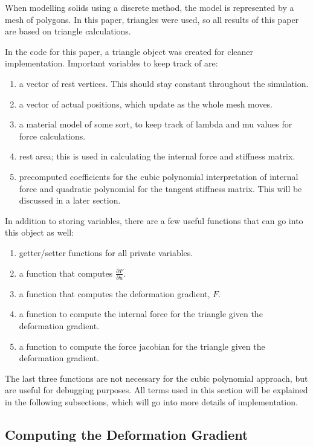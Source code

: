 \documentclass[twocolumn,10pt]{asme2ej}
\begin{document}
When modelling solids using a discrete method, the model is represented by a mesh of polygons. In this paper, triangles were
used, so all results of this paper are based on triangle calculations.

In the code for this paper, a triangle object was created for cleaner implementation. Important variables to keep track of are:
\begin{enumerate}
  \item a vector of rest vertices. This should stay constant throughout the simulation.
  \item a vector of actual positions, which update as the whole mesh moves.
  \item a material model of some sort, to keep track of lambda and mu values for force calculations.
  \item rest area; this is used in calculating the internal force and stiffness matrix.
  \item precomputed coefficients for the cubic polynomial interpretation of internal force and quadratic polynomial
  for the tangent stiffness matrix. This will be discussed in a later section.
\end{enumerate}

In addition to storing variables, there are a few useful functions that can go into this object as well:
\begin{enumerate}
  \item getter/setter functions for all private variables.
  \item a function that computes $\frac{\partial F}{\partial u}$.
  \item a function that computes the deformation gradient, $F$.
  \item a function to compute the internal force for the triangle given the deformation gradient.
  \item a function to compute the force jacobian for the triangle given the deformation gradient.
\end{enumerate}

The last three functions are not necessary for the cubic polynomial approach, but are useful for debugging purposes.
All terms used in this section will be explained in the following subsections, which will go into more details of
implementation.

\subsection{Computing the Deformation Gradient}
\end{document}
